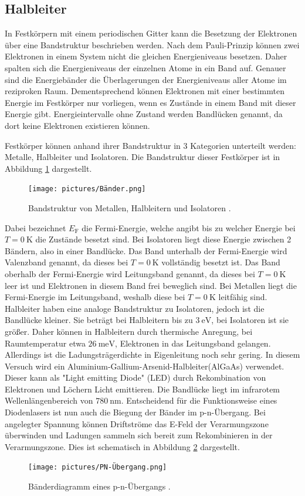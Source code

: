 \subsection{Halbleiter}
In Festkörpern mit einem periodischen Gitter kann die Besetzung der Elektronen über eine Bandstruktur beschrieben werden.
Nach dem Pauli-Prinzip können zwei Elektronen in einem System nicht die gleichen Energieniveaus besetzen. Daher spalten sich 
die Energieniveaus der einzelnen Atome in ein Band auf. Genauer sind die Energiebänder die Überlagerungen der Energieniveaus aller Atome im 
reziproken Raum. Dementsprechend können Elektronen mit einer bestimmten Energie im Festkörper nur vorliegen, wenn es Zustände in einem Band mit dieser 
Energie gibt. Energieintervalle ohne Zustand werden Bandlücken genannt, da dort keine Elektronen existieren können.

\noindent Festkörper können anhand ihrer Bandstruktur in 3 Kategorien unterteilt werden: Metalle, Halbleiter und Isolatoren.
Die Bandstruktur dieser Festkörper ist in Abbildung \ref{fig:Band} dargestellt.
\begin{figure}[H]
    \centering
    \texttt{[image: pictures/Bänder.png]}
    \caption{Bandstruktur von Metallen, Halbleitern und Isolatoren \cite{demtröder}.}
    \label{fig:Band}
\end{figure}
\noindent Dabei bezeichnet $E_\text{F}$ die Fermi-Energie, welche angibt bis zu welcher Energie bei $T=\qty{0}{\kelvin}$ die Zustände besetzt sind.
Bei Isolatoren liegt diese Energie zwischen 2 Bändern, also in einer Bandlücke. Das Band unterhalb der Fermi-Energie wird Valenzband genannt, 
da dieses bei $T=\qty{0}{\kelvin}$ vollständig besetzt ist. Das Band oberhalb der Fermi-Energie wird Leitungsband genannt, da dieses bei $T=\qty{0}{\kelvin}$ leer ist und 
Elektronen in diesem Band frei beweglich sind. Bei Metallen liegt die Fermi-Energie im Leitungsband, weshalb diese bei $T=\qty{0}{\kelvin}$ leitfähig sind.
Halbleiter haben eine analoge Bandstruktur zu Isolatoren, jedoch ist die Bandlücke kleiner. Sie beträgt bei Halbleitern bis zu $\qty{3}{\eV}$, bei Isolatoren 
ist sie größer. Daher können in Halbleitern durch thermische Anregung, bei Raumtemperatur etwa $\qty{26}{\milli\eV}$, Elektronen in das Leitungsband gelangen. 
Allerdings ist die Ladungsträgerdichte in Eigenleitung noch sehr gering. In diesem Versuch wird ein Aluminium-Gallium-Arsenid-Halbleiter(AlGaAs) verwendet. Dieser kann als "Light emitting Diode" (LED)
durch Rekombination von Elektronen und Löchern Licht emittieren. Die Bandlücke liegt im infrarotem Wellenlängenbereich von $\qty{780}{\nano\meter}$.
Entscheidend für die Funktionsweise eines Diodenlasers ist nun auch die Biegung der Bänder im p-n-Übergang. Bei angelegter Spannung können 
Driftströme das E-Feld der Verarmungszone überwinden und Ladungen sammeln sich bereit zum Rekombinieren in der Verarmungszone.
Dies ist schematisch in Abbildung \ref{fig:PN} dargestellt. 
\begin{figure}[H]
    \centering
    \texttt{[image: pictures/PN-Übergang.png]}
    \caption{Bänderdiagramm eines p-n-Übergangs \cite{Demtröder}.}
    \label{fig:PN}
\end{figure}
